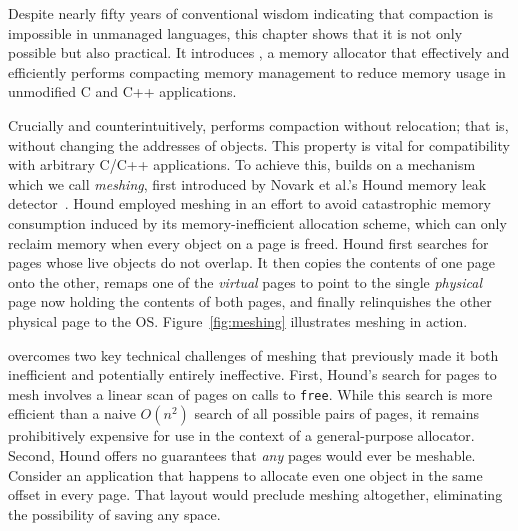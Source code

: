 




Despite nearly fifty years of conventional wisdom indicating that
compaction is impossible in unmanaged languages, this chapter shows that
it is not only possible but also practical. It introduces
\Mesh, a memory allocator that effectively and efficiently performs
compacting memory management to reduce memory usage in unmodified
C and C++ applications.

Crucially and counterintuitively, \Mesh performs compaction without
relocation; that is, without changing the addresses of objects. This
property is vital for compatibility with arbitrary C/C++
applications. To achieve this, \Mesh{} builds on a mechanism which we
call \emph{meshing}, first introduced by Novark et al.'s Hound memory
leak detector~\cite{1542521}. Hound employed meshing in an effort to avoid
catastrophic memory consumption induced by its memory-inefficient
allocation scheme, which can only reclaim memory when every object on
a page is freed. Hound first searches for pages whose live objects do
not overlap. It then copies the contents of one page onto the other,
remaps one of the \emph{virtual} pages to point to the single
\emph{physical} page now holding the contents of both pages, and
finally relinquishes the other physical page to the
OS. Figure~\ref{fig:meshing} illustrates meshing in action.

\Mesh{} overcomes two key technical challenges of meshing that previously made
it both inefficient and potentially entirely ineffective. First,
Hound's search for pages to mesh involves a linear scan of pages on
calls to \texttt{free}. While this search is more efficient than a
naive $O(n^2)$ search of all possible pairs of pages, it remains
prohibitively expensive for use in the context of a general-purpose
allocator. Second, Hound offers no guarantees that \emph{any} pages
would ever be meshable.  Consider an application that happens to
allocate even one object in the same offset in every page. That layout
would preclude meshing altogether, eliminating the possibility of
saving any space.

